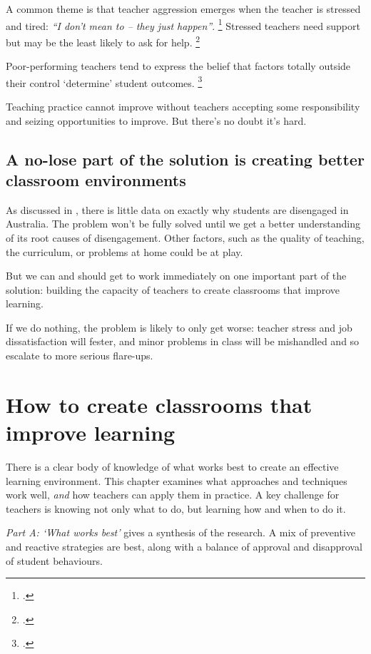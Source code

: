 \documentclass[FrontPage]{grattan}
\begin{document}
A common theme is that teacher aggression emerges when the teacher is stressed and tired: \emph{``I don't mean to -- they just happen''}.%
    \footcite{RileyBrew2010WhyDidYouDoThat}
Stressed teachers need support but may be the least likely to ask for help.%
    \footcite{Lewis2001ClassroomDisciplineStudent} 
 
Poor-performing teachers tend to express the belief that factors totally outside their control `determine' student outcomes.%
    \footcite{Lingard2001QueenslandSchoolReformFinalReport}

Teaching practice cannot improve without teachers accepting some responsibility and seizing opportunities to improve.
But there's no doubt it's hard.
 
\section{A no-lose part of the solution is creating better classroom environments}\label{sec:no-lose-part-of-solution}
As discussed in , there is little data on exactly why students are disengaged in Australia. The problem won't be fully solved until we get a better understanding of its root causes of disengagement. Other factors, such as the quality of teaching, the curriculum, or problems at home could be at play.
 
But we can and should get to work immediately on one important part of the solution: building the capacity of teachers to create classrooms that improve learning. 
 
If we do nothing, the problem is likely to only get worse: teacher stress and job dissatisfaction will fester, and minor problems in class will be mishandled and so escalate to more serious flare-ups. 

\chapter{How to create classrooms that improve learning}\label{chap:what-works-best}

There is a clear body of knowledge of what works best to create an effective learning environment. This chapter examines what approaches and techniques work well, \emph{and} how teachers can apply them in practice. A key challenge for teachers is knowing not only what to do, but learning how and when to do it.
 
\emph{Part A: `What works best'} gives a synthesis of the research. A mix of preventive and reactive strategies are best, along with a balance of approval and disapproval of student behaviours. 
 
\end{document}
